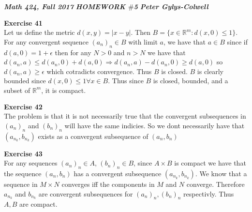 \documentclass[12pt]{article}
\newenvironment{ques}[1]{\textbf{Exercise #1}\vspace{1 mm}\\ }{\bigskip}
\theoremstyle{definition}
\newcommand{\R}{\mathbb R}
\begin{document}
\noindent \textit{\textbf{Math 424, Fall 2017}} \hspace{1.3cm}
\textit{\textbf{HOMEWORK $\#$5}} \hspace{1.3cm} \textit{\textbf{Peter
Gylys-Colwell}} 

\vspace{1cm}

\begin{ques}{41}
	Let us define the metric $d(x,y) = |x - y|$. Then $B = \{x \in \R^m : d(x,0)
	\leq 1\}$. For any convergent sequence $(a_n)_n \in B$ with limit $a$, we have
	that $a \in B$ since if $d(a,0) = 1 + \epsilon$ then for any $N > 0$ and $n >
	N$ we have that $d(a_n, a) \leq d(a_n, 0) + d(a,0) \Rightarrow d(a_n,a)  -
	d(a_n,0) \geq d(a,0)$ so $d(a_n,a) \geq \epsilon$ which cotradicts
	convergence. Thus $B$ is closed. $B$ is clearly bounded since $d(x,0) \leq
	1 \forall x \in B$. Thus since $B$ is closed, bounded, and a subset of
	$\R^m$, it is compact.
\end{ques}

\begin{ques}{42}
	The problem is that it is not necessarily true that the convergent
	subsequences in $(a_n)_n$ and $(b_n)_n$ will have the same indicies. So we
	dont necessarily have that $(a_{n_k}, b_{n_k})$ exists as a convergent
	subsequence of $(a_n, b_n)$ 
\end{ques}

\begin{ques}{43}
	For any sequences $(a_n)_n \in A$, $(b_n)_n \in B$, since $A \times B$ is
	compact we have that the sequence $(a_n,b_n)$ has a
	convergent subsequence $(a_{n_k},b_{n_k})$. We know that a sequence in $M \times
	N$ converges iff the components in $M$ and $N$ converge. Therefore
	$a_{n_k}$ and $b_{n_k}$ are convergent subsequences for $(a_n)_n, (b_n)_n$
	respectivly. Thus $A, B$ are compact.
\end{ques}
\end{document}
